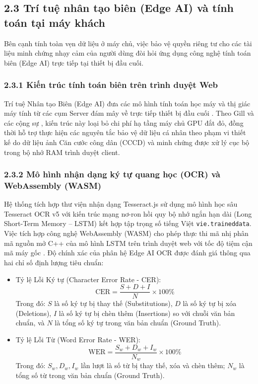 \documentclass[12pt,a4paper]{report}
\begin{document}
\subsection*{2.3 Trí tuệ nhân tạo biên (Edge AI) và tính toán tại máy khách}
Bên cạnh tính toàn vẹn dữ liệu ở máy chủ, việc bảo vệ quyền riêng tư cho các tài liệu minh chứng nhạy cảm của người dùng đòi hỏi ứng dụng công nghệ tính toán biên (Edge AI) trực tiếp tại thiết bị đầu cuối.

\subsubsection*{2.3.1 Kiến trúc tính toán biên trên trình duyệt Web}
Trí tuệ Nhân tạo Biên (Edge AI) đưa các mô hình tính toán học máy và thị giác máy tính từ các cụm Server đám mây về trực tiếp thiết bị đầu cuối \cite{singh2023edgeai}. Theo Gill và các cộng sự \cite{gill2024edgeai}, kiến trúc này loại bỏ chi phí hạ tầng máy chủ GPU đắt đỏ, đồng thời hỗ trợ thực hiện các nguyên tắc bảo vệ dữ liệu cá nhân theo phạm vi thiết kế do dữ liệu ảnh Căn cước công dân (CCCD) và minh chứng được xử lý cục bộ trong bộ nhớ RAM trình duyệt client.

\subsubsection*{2.3.2 Mô hình nhận dạng ký tự quang học (OCR) và WebAssembly (WASM)}
Hệ thống tích hợp thư viện nhận dạng Tesseract.js sử dụng mô hình học sâu Tesseract OCR v5 với kiến trúc mạng nơ-ron hồi quy bộ nhớ ngắn hạn dài (Long Short-Term Memory -- LSTM) kết hợp tập trọng số tiếng Việt \texttt{vie.traineddata}. Việc tích hợp công nghệ WebAssembly (WASM) cho phép thực thi mã nhị phân mã nguồn mở C++ của mô hình LSTM trên trình duyệt web với tốc độ tiệm cận mã máy gốc \cite{passarotto2024edge}. Độ chính xác của phân hệ Edge AI OCR được đánh giá thông qua hai chỉ số định lượng tiêu chuẩn:
\begin{itemize}[label=--,leftmargin=*]
  \item Tỷ lệ Lỗi Ký tự (Character Error Rate - CER):
        \begin{equation}
          \text{CER} = \frac{S + D + I}{N} \times 100\%
        \end{equation}
        Trong đó: $S$ là số ký tự bị thay thế (Substitutions), $D$ là số ký tự bị xóa (Deletions), $I$ là số ký tự bị chèn thêm (Insertions) so với chuỗi văn bản chuẩn, và $N$ là tổng số ký tự trong văn bản chuẩn (Ground Truth).
  \item Tỷ lệ Lỗi Từ (Word Error Rate - WER):
        \begin{equation}
          \text{WER} = \frac{S_w + D_w + I_w}{N_w} \times 100\%
        \end{equation}
        Trong đó: $S_w, D_w, I_w$ lần lượt là số từ bị thay thế, xóa và chèn thêm; $N_w$ là tổng số từ trong văn bản chuẩn (Ground Truth).
\end{itemize}
\end{document}
